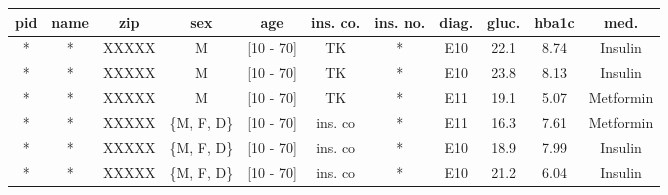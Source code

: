 \begin{table}[ht]
    \begin{center}
        \footnotesize{
            \renewcommand{\arraystretch}{1.5}
            \begin{adjustbox}{center}
                \begin{tabular}{ | c | c | c | c | c | c | c | c | c | c | c | } 
                    \hline
                    \cellcolor{lightred} pid & \cellcolor{lightred} name & \cellcolor{lightyellow} zip & \cellcolor{lightyellow} sex & \cellcolor{lightyellow} age & \cellcolor{lightyellow} ins. co. & \cellcolor{lightred} ins. no. & diag. & gluc. & hba1c & med. \\
                    \hline
                    \cellcolor{lightred} * & \cellcolor{lightred} * & \cellcolor{lightyellow} XXXXX & M & \cellcolor{lightyellow} {[10 - 70]} & TK & \cellcolor{lightred} * & E10 & 22.1 & 8.74 & Insulin \\
                    \hline
                    \cellcolor{lightred} * & \cellcolor{lightred} * & \cellcolor{lightyellow} XXXXX & M & \cellcolor{lightyellow} {[10 - 70]} & TK & \cellcolor{lightred} * & E10 & 23.8 & 8.13 & Insulin \\
                    \hline 
                    \cellcolor{lightred} * & \cellcolor{lightred} * & \cellcolor{lightyellow} XXXXX & M & \cellcolor{lightyellow} {[10 - 70]} & TK & \cellcolor{lightred} * & E11 & 19.1 & 5.07 & Metformin \\
                    \hline
                    \cellcolor{lightred} * & \cellcolor{lightred} * & \cellcolor{lightyellow} XXXXX & \cellcolor{lightyellow} \{M, F, D\} & \cellcolor{lightyellow} {[10 - 70]} & \cellcolor{lightyellow} ins. co & \cellcolor{lightred} * & E11 & 16.3 & 7.61 & Metformin \\
                    \hline
                    \cellcolor{lightred} * & \cellcolor{lightred} * & \cellcolor{lightyellow} XXXXX & \cellcolor{lightyellow} \{M, F, D\} & \cellcolor{lightyellow} {[10 - 70]} & \cellcolor{lightyellow} ins. co & \cellcolor{lightred} * & E10 & 18.9 & 7.99 & Insulin \\
                    \hline
                    \cellcolor{lightred} * & \cellcolor{lightred} * & \cellcolor{lightyellow} XXXXX & \cellcolor{lightyellow} \{M, F, D\} & \cellcolor{lightyellow} {[10 - 70]} & \cellcolor{lightyellow} ins. co & \cellcolor{lightred} * & E10 & 21.2 & 6.04 & Insulin \\
                    \hline
                \end{tabular}

\end{adjustbox}}
\end{center}
\end{table}
